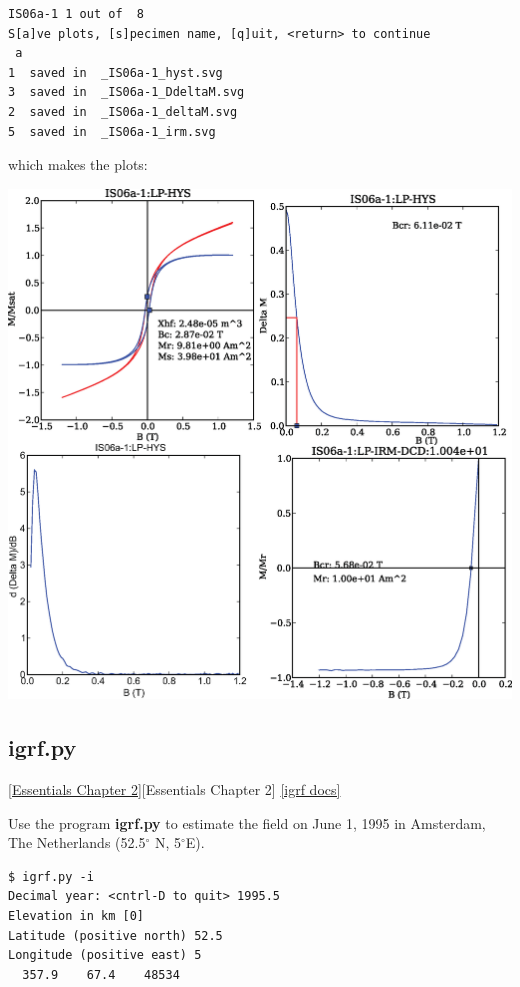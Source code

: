 \documentclass[11pt]{book}
\begin{document}
{{\begin{verbatim}
IS06a-1 1 out of  8
S[a]ve plots, [s]pecimen name, [q]uit, <return> to continue
 a
1  saved in  _IS06a-1_hyst.svg
3  saved in  _IS06a-1_DdeltaM.svg
2  saved in  _IS06a-1_deltaM.svg
5  saved in  _IS06a-1_irm.svg
\end{verbatim}

\noindent which makes the plots:


  \includegraphics[width=15cm]{EPSfiles/hysteresis-magic.eps}




\subsection{igrf.py}
\href{http://earthref.org/MAGIC/books/Tauxe/Essentials/WebBook3ch2.html#ch2}{[Essentials Chapter 2]}[Essentials Chapter 2]
\href{https://github.com/PmagPy/PmagPy/blob/master/programs/igrf.py}{[igrf docs]}

Use the program {\bf igrf.py } to estimate the
field on June 1, 1995 in Amsterdam, The Netherlands (52.5$^{\circ}$ N, 5$^{\circ}$E).

\begin{verbatim}
$ igrf.py -i
Decimal year: <cntrl-D to quit> 1995.5
Elevation in km [0]
Latitude (positive north) 52.5
Longitude (positive east) 5
  357.9    67.4    48534


\end{verbatim}}}
\end{document}
